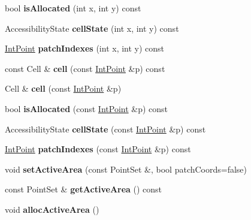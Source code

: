 \begin{DoxyCompactItemize}
bool {\bfseries is\+Allocated} (int x, int y) const
\item 
\mbox{\label{classGMapping_1_1HierarchicalArray2D_a37ce321fda8e7bd3953712fc8ca1e931}} 
Accessibility\+State {\bfseries cell\+State} (int x, int y) const
\item 
\mbox{\label{classGMapping_1_1HierarchicalArray2D_a47c8875306a6ccf469aa4ad2e90832ff}} 
\hyperlink{structGMapping_1_1point}{Int\+Point} {\bfseries patch\+Indexes} (int x, int y) const
\item 
\mbox{\label{classGMapping_1_1HierarchicalArray2D_a95618a4c7ec95b32369fb9c242604df9}} 
const Cell \& {\bfseries cell} (const \hyperlink{structGMapping_1_1point}{Int\+Point} \&p) const
\item 
\mbox{\label{classGMapping_1_1HierarchicalArray2D_ad6ebc1a84c5f7372f0f4b392a92c7b16}} 
Cell \& {\bfseries cell} (const \hyperlink{structGMapping_1_1point}{Int\+Point} \&p)
\item 
\mbox{\label{classGMapping_1_1HierarchicalArray2D_afd9515a52dcc78a1800d8704c2b0ef20}} 
bool {\bfseries is\+Allocated} (const \hyperlink{structGMapping_1_1point}{Int\+Point} \&p) const
\item 
\mbox{\label{classGMapping_1_1HierarchicalArray2D_a4e73cf41869cbc193bd9f9d16be616f6}} 
Accessibility\+State {\bfseries cell\+State} (const \hyperlink{structGMapping_1_1point}{Int\+Point} \&p) const
\item 
\mbox{\label{classGMapping_1_1HierarchicalArray2D_ad4f1306880b973886c436a06afaa47f3}} 
\hyperlink{structGMapping_1_1point}{Int\+Point} {\bfseries patch\+Indexes} (const \hyperlink{structGMapping_1_1point}{Int\+Point} \&p) const
\item 
\mbox{\label{classGMapping_1_1HierarchicalArray2D_a399f280ae58ca46305f5a85df8b7686c}} 
void {\bfseries set\+Active\+Area} (const Point\+Set \&, bool patch\+Coords=false)
\item 
\mbox{\label{classGMapping_1_1HierarchicalArray2D_a2ab5a0190c954a8b12674e9ab1e95177}} 
const Point\+Set \& {\bfseries get\+Active\+Area} () const
\item 
\mbox{\label{classGMapping_1_1HierarchicalArray2D_af017c9fa14f942f1293c981494cac602}} 
void {\bfseries alloc\+Active\+Area} ()
\end{DoxyCompactItemize}

